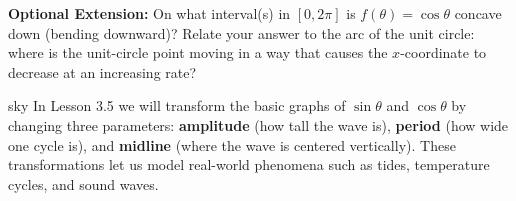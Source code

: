 \documentclass[10pt]{article}
\begin{document}
\vspace{0.1in}

\begin{extensionbox}
\textbf{Optional Extension:} On what interval(s) in $[0, 2\pi]$ is $f(\theta) = \cos\theta$
concave down (bending downward)? Relate your answer to the arc of the unit circle: where is
the unit-circle point moving in a way that causes the $x$-coordinate to decrease at an
increasing rate?

\vspace{6pt}
\end{extensionbox}

\vspace{0.1in}

\begin{blurbbox}{sky}
In Lesson 3.5 we will transform the basic graphs of $\sin\theta$ and $\cos\theta$ by
changing three parameters: \textbf{amplitude} (how tall the wave is), \textbf{period}
(how wide one cycle is), and \textbf{midline} (where the wave is centered vertically).
These transformations let us model real-world phenomena such as tides, temperature cycles,
and sound waves.
\end{blurbbox}
\end{document}
